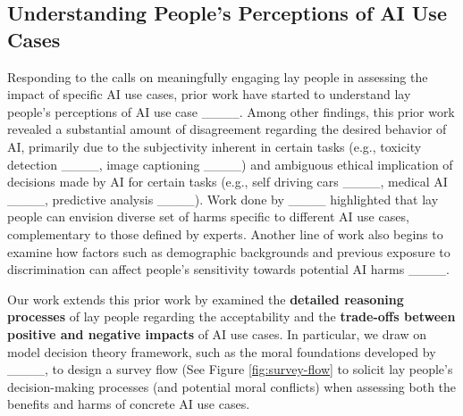 \subsection{Understanding People's Perceptions of AI Use Cases}
\label{ssec:understanding-}
Responding to the calls on meaningfully engaging lay people in assessing the impact of specific AI use cases, prior work have started to understand lay people's perceptions of AI use case ____. Among other findings, this prior work revealed a substantial amount of disagreement regarding the desired behavior of AI, primarily due to the subjectivity inherent in certain tasks (e.g., toxicity detection ____, image captioning ____) and ambiguous ethical implication of decisions made by AI for certain tasks (e.g., self driving cars ____, medical AI ____, predictive analysis ____). Work done by 
____ highlighted that lay people can envision diverse set of harms specific to different AI use cases, complementary to those defined by experts. Another line of work also begins to examine how factors such as demographic backgrounds and previous exposure to discrimination can affect people's sensitivity towards potential AI harms ____. 

Our work extends this prior work by examined the \textbf{detailed reasoning processes} of lay people regarding the acceptability and the \textbf{trade-offs between positive and negative impacts} of AI use cases. In particular, we draw on model decision theory framework, such as the moral foundations developed by ____, to design a survey flow (See Figure \ref{fig:survey-flow} to solicit lay people's decision-making processes (and potential moral conflicts) when assessing both the benefits and harms of concrete AI use cases. 


